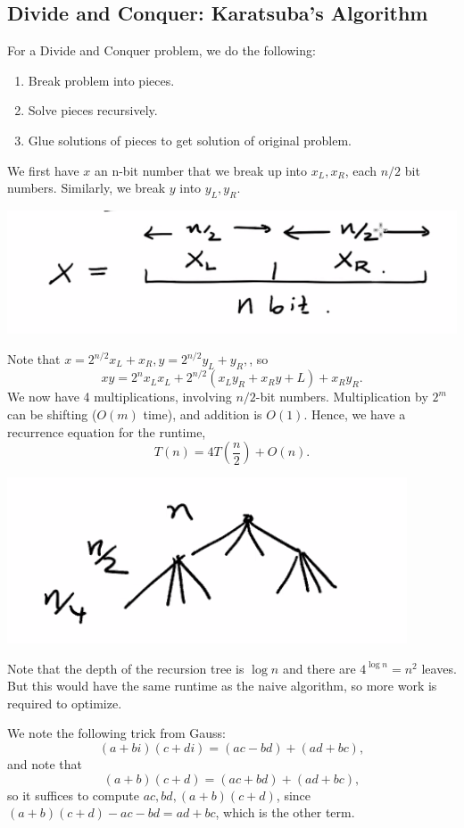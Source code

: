 \documentclass[11pt]{scrartcl}
\begin{document}
\subsection{Divide and Conquer: Karatsuba's Algorithm}
For a Divide and Conquer problem, we do the following:
\begin{enumerate}
\item  Break problem into pieces.
\item Solve pieces recursively.
\item Glue solutions of pieces to get solution of original problem.
\end{enumerate}
We first have $x$ an n-bit number that we break up into $x_L, x_R$, each $n/2$ bit numbers.  Similarly, we break $y$ into $y_L, y_R$.
\begin{center}
\includegraphics[scale=0.5]{dac.png}
\end{center}
Note that $x = 2^{n/2}x_L + x_R, y = 2^{n/2}y_L + y_R,$, so
$$xy = 2^n x_Lx_L + 2^{n/2}(x_Ly_R + x_Ry+L) + x_Ry_R.$$
We now have 4 multiplications, involving $n/2$-bit numbers.  Multiplication by $2^m$ can be shifting ($O(m)$ time), and addition is $O(1)$.  Hence, we have a recurrence equation for the runtime,
$$T(n) = 4T\left (\frac{n}{2}\right ) + O(n).$$
\begin{center}
\includegraphics[scale=0.5]{rec.png}
\end{center}
Note that the depth of the recursion tree is $\log n$ and there are $4^{\log n} = n^2$ leaves.  But this would have the same runtime as the naive algorithm, so more work is required to optimize.

We note the following trick from Gauss:
$$(a+bi)(c+di) = (ac-bd) + (ad+bc),$$
and note that $$(a+b)(c+d) = (ac+bd) + (ad+bc),$$
so it suffices to compute $ac, bd, (a+b)(c+d)$, since $(a+b)(c+d)-ac-bd = ad+bc$, which is the other term.
\end{document}
